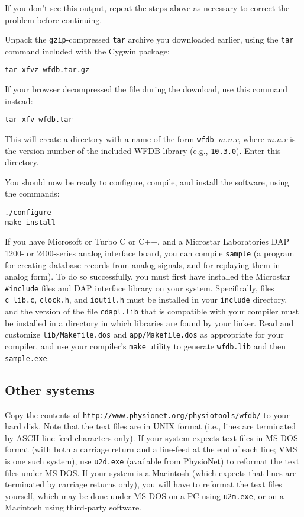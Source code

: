 \documentclass[twoside]{article}
\begin{document}
If you don't see this output, repeat the steps above as necessary to correct
the problem before continuing.

Unpack the {\tt gzip}-compressed {\tt tar} archive you downloaded earlier,
using the {\tt tar} command included with the Cygwin package:

\begin{verbatim}
tar xfvz wfdb.tar.gz
\end{verbatim}

If your browser decompressed the file during the download, use this command
instead:

\begin{verbatim}
tar xfv wfdb.tar
\end{verbatim}

This will create a directory with a name of the form {\tt wfdb-}{\em m.n.r},
where {\em m.n.r} is the version number of the included WFDB library (e.g.,
{\tt 10.3.0}).  Enter this directory.

You should now be ready to configure, compile, and install the software, using
the commands:

\begin{verbatim}
./configure
make install
\end{verbatim}

If you have Microsoft or Turbo C or C++, and a Microstar Laboratories DAP 1200-
or 2400-series analog interface board, you can compile {\tt sample} (a program
for creating database records from analog signals, and for replaying them in
analog form).  To do so successfully, you must first have installed the
Microstar {\tt \#include} files and DAP interface library on your system.
Specifically, files {\tt c\_lib.c}, {\tt clock.h}, and {\tt ioutil.h} must be
installed in your {\tt include} directory, and the version of the file
{\tt cdapl.lib} that is compatible with your compiler must be installed in a
directory in which libraries are found by your linker.  Read and customize
{\tt lib/Makefile.dos} and {\tt app/Makefile.dos} as appropriate for your
compiler, and use your compiler's {\tt make} utility to generate {\tt wfdb.lib}
and then {\tt sample.exe}.

\subsection*{Other systems}

Copy the contents of {\tt http://www.\-physio\-net.\-org/physio\-tools/wfdb/}
to your hard disk.  Note that the text files are in UNIX format (i.e., lines
are terminated by ASCII line-feed characters only).  If your system expects
text files in MS-DOS format (with both a carriage return and a line-feed at the
end of each line; VMS is one such system), use {\tt u2d.exe} (available from
PhysioNet) to reformat the text files under MS-DOS.  If your system is a
Macintosh (which expects that lines are terminated by carriage returns only),
you will have to reformat the text files yourself, which may be done under
MS-DOS on a PC using {\tt u2m.exe}, or on a Macintosh using third-party
software.
\end{document}
